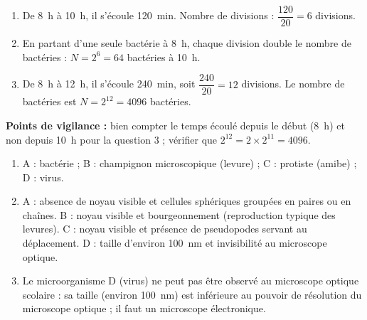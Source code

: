\documentclass[11pt]{article}
\newcounter{popsec}
\newcounter{popsub}
\newcommand{\courssub}[1]{%
  \stepcounter{popsub}%
  \par\vspace{9pt}\noindent{\popxbold\fontsize{11.5}{13}\selectfont\color{popink}{\color{poporange}\thepopsec.\thepopsub}\hspace{6pt}#1}\par\nopagebreak\vspace{4pt}
}
\begin{document}
\begin{corrige}
\begin{enumerate}
\item De \SI{8}{h} à \SI{10}{h}, il s'écoule \SI{120}{min}. Nombre de divisions : $\dfrac{120}{20} = 6$ divisions.
\item En partant d'une seule bactérie à \SI{8}{h}, chaque division double le nombre de bactéries : $N = 2^{6} = 64$ bactéries à \SI{10}{h}.
\item De \SI{8}{h} à \SI{12}{h}, il s'écoule \SI{240}{min}, soit $\dfrac{240}{20} = 12$ divisions. Le nombre de bactéries est $N = 2^{12} = \num{4096}$ bactéries.
\end{enumerate}
\textbf{Points de vigilance :} bien compter le temps écoulé depuis le début (\SI{8}{h}) et non depuis \SI{10}{h} pour la question 3 ; vérifier que $2^{12} = 2 \times 2^{11} = \num{4096}$.
\end{corrige}

\courssub{Je m'entraîne}

\begin{corrige}
\begin{enumerate}
\item A : bactérie ; B : champignon microscopique (levure) ; C : protiste (amibe) ; D : virus.
\item A : absence de noyau visible et cellules sphériques groupées en paires ou en chaînes. B : noyau visible et bourgeonnement (reproduction typique des levures). C : noyau visible et présence de pseudopodes servant au déplacement. D : taille d'environ \SI{100}{nm} et invisibilité au microscope optique.
\item Le microorganisme D (virus) ne peut pas être observé au microscope optique scolaire : sa taille (environ \SI{100}{nm}) est inférieure au pouvoir de résolution du microscope optique ; il faut un microscope électronique.
\end{enumerate}
\end{corrige}
\end{document}
